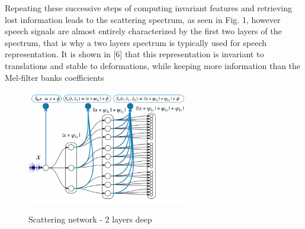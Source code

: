 Repeating these successive steps of computing invariant features and retrieving lost information leads to the scattering spectrum, as seen in Fig. 1, however speech signals are almost entirely characterized by the first two layers of the spectrum, that is why a two layers spectrum is typically used for speech representation. It is shown in [6] that this representation is invariant to translations and stable to deformations, while keeping more information than the Mel-filter banks coefficients
\begin{figure}
\centering
  \includegraphics[width=7cm]{thesis/images/scatter.png}\\
  \caption{Scattering network - 2 layers deep} \cite{zeghidour2016deep}\label{fig_4_3_scatter}
\end{figure}
